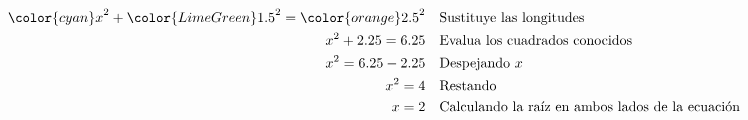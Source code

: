 \begin{minipage}[t][][t]{0.65\textwidth}
\begin{solutionbox}{10cm}
\begin{align*}
            {\color{cyan}x}^2+{\color{LimeGreen}1.5}^2  ={\color{orange}2.5}^2 & \text{\quad Sustituye las longitudes}                         \\
            x^2+2.25   =6.25                                                   & \text{\quad Evalua los cuadrados conocidos}                   \\
            x^2=6.25-2.25                                                      & \text{\quad Despejando } x                                    \\
            x^2=4                                                              & \text{\quad Restando}                                         \\
            x=2                                                                & \text{\quad Calculando la raíz en ambos lados de la ecuación} \\
        \end{align*}
    \end{solutionbox}
\end{minipage}
